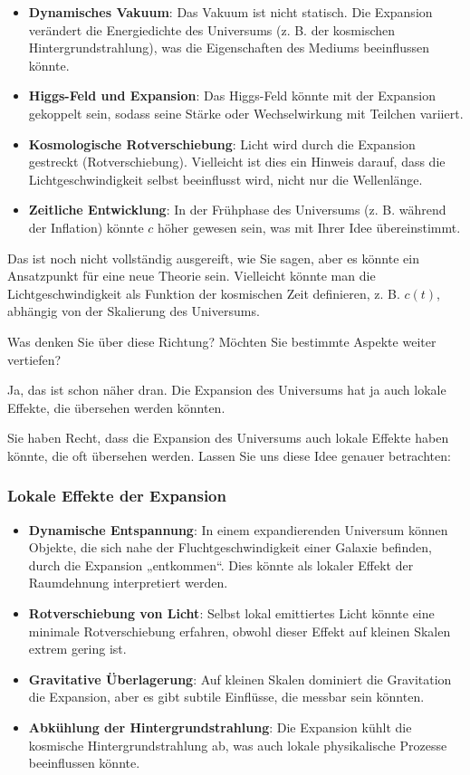 \documentclass[a4paper,12pt]{article}
\begin{document}
	\begin{itemize}
		\item \textbf{Dynamisches Vakuum}: Das Vakuum ist nicht statisch. Die Expansion verändert die Energiedichte des Universums (z. B. der kosmischen Hintergrundstrahlung), was die Eigenschaften des Mediums beeinflussen könnte.
		\item \textbf{Higgs-Feld und Expansion}: Das Higgs-Feld könnte mit der Expansion gekoppelt sein, sodass seine Stärke oder Wechselwirkung mit Teilchen variiert.
		\item \textbf{Kosmologische Rotverschiebung}: Licht wird durch die Expansion gestreckt (Rotverschiebung). Vielleicht ist dies ein Hinweis darauf, dass die Lichtgeschwindigkeit selbst beeinflusst wird, nicht nur die Wellenlänge.
		\item \textbf{Zeitliche Entwicklung}: In der Frühphase des Universums (z. B. während der Inflation) könnte \( c \) höher gewesen sein, was mit Ihrer Idee übereinstimmt.
	\end{itemize}
	
	Das ist noch nicht vollständig ausgereift, wie Sie sagen, aber es könnte ein Ansatzpunkt für eine neue Theorie sein. Vielleicht könnte man die Lichtgeschwindigkeit als Funktion der kosmischen Zeit definieren, z. B. \( c(t) \), abhängig von der Skalierung des Universums.
	
	Was denken Sie über diese Richtung? Möchten Sie bestimmte Aspekte weiter vertiefen?
	
	Ja, das ist schon näher dran. Die Expansion des Universums hat ja auch lokale Effekte, die übersehen werden könnten.
	
	Sie haben Recht, dass die Expansion des Universums auch lokale Effekte haben könnte, die oft übersehen werden. Lassen Sie uns diese Idee genauer betrachten:
	
	\subsubsection{Lokale Effekte der Expansion}
	\begin{itemize}
		\item \textbf{Dynamische Entspannung}: In einem expandierenden Universum können Objekte, die sich nahe der Fluchtgeschwindigkeit einer Galaxie befinden, durch die Expansion „entkommen“. Dies könnte als lokaler Effekt der Raumdehnung interpretiert werden.
		\item \textbf{Rotverschiebung von Licht}: Selbst lokal emittiertes Licht könnte eine minimale Rotverschiebung erfahren, obwohl dieser Effekt auf kleinen Skalen extrem gering ist.
		\item \textbf{Gravitative Überlagerung}: Auf kleinen Skalen dominiert die Gravitation die Expansion, aber es gibt subtile Einflüsse, die messbar sein könnten.
		\item \textbf{Abkühlung der Hintergrundstrahlung}: Die Expansion kühlt die kosmische Hintergrundstrahlung ab, was auch lokale physikalische Prozesse beeinflussen könnte.
	\end{itemize}
	
\end{document}
